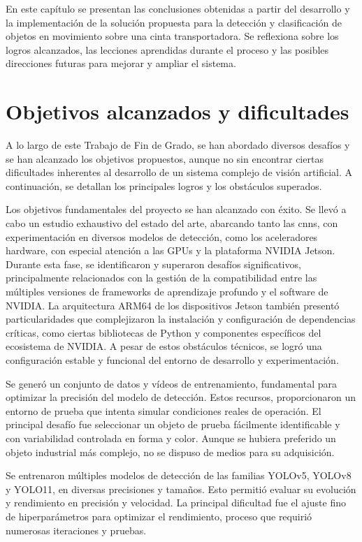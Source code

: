 \documentclass[11pt,spanish,listoffigures,listoftables]{tfgetsinf}
\begin{document}
En este capítulo se presentan las conclusiones obtenidas a partir del desarrollo y la implementación de la solución propuesta para la detección y clasificación de objetos en movimiento sobre una cinta transportadora. Se reflexiona sobre los logros alcanzados, las lecciones aprendidas durante el proceso y las posibles direcciones futuras para mejorar y ampliar el sistema.

\section{Objetivos alcanzados y dificultades}

A lo largo de este Trabajo de Fin de Grado, se han abordado diversos desafíos y se han alcanzado los objetivos propuestos, aunque no sin encontrar ciertas dificultades inherentes al desarrollo de un sistema complejo de visión artificial. A continuación, se detallan los principales logros y los obstáculos superados.

Los objetivos fundamentales del proyecto se han alcanzado con éxito. Se llevó a cabo un estudio exhaustivo del estado del arte, abarcando tanto las \glspl{cnn}, con experimentación en diversos modelos de detección, como los aceleradores hardware, con especial atención a las GPUs y la plataforma NVIDIA Jetson. Durante esta fase, se identificaron y superaron desafíos significativos, principalmente relacionados con la gestión de la compatibilidad entre las múltiples versiones de frameworks de aprendizaje profundo y el software de NVIDIA. La arquitectura ARM64 de los dispositivos Jetson también presentó particularidades que complejizaron la instalación y configuración de dependencias críticas, como ciertas bibliotecas de Python y componentes específicos del ecosistema de NVIDIA. A pesar de estos obstáculos técnicos, se logró una configuración estable y funcional del entorno de desarrollo y experimentación.

Se generó un conjunto de datos y vídeos de entrenamiento, fundamental para optimizar la precisión del modelo de detección. Estos recursos, proporcionaron un entorno de prueba que intenta simular condiciones reales de operación. El principal desafío fue seleccionar un objeto de prueba fácilmente identificable y con variabilidad controlada en forma y color. Aunque se hubiera preferido un objeto industrial más complejo, no se dispuso de medios para su adquisición.

Se entrenaron múltiples modelos de detección de las familias YOLOv5, YOLOv8 y YOLO11, en diversas precisiones y tamaños. Esto permitió evaluar su evolución y rendimiento en precisión y velocidad. La principal dificultad fue el ajuste fino de hiperparámetros para optimizar el rendimiento, proceso que requirió numerosas iteraciones y pruebas.
\end{document}

